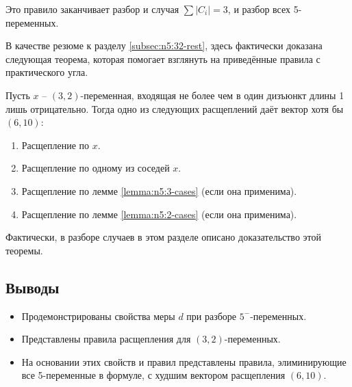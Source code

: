 Это правило заканчивает разбор и случая $\sum |C_i| = 3$, и разбор всех 5-переменных.

В качестве резюме к разделу \ref{subsec:n5:32-rest}, здесь фактически доказана следующая теорема, которая помогает взглянуть на приведённые правила с практического угла.

\begin{theorem}
 Пусть $x$ -- $(3,2)$-переменная, входящая не более чем в один дизъюнкт длины 1 лишь отрицательно. Тогда одно из следующих расщеплений даёт вектор хотя бы $(6,10)$:

 \begin{enumerate}
  \item Расщепление по $x$.
  \item Расщепление по одному из соседей $x$.
  \item Расщепление по лемме \ref{lemma:n5:3-cases} (если она применима).
  \item Расщепление по лемме \ref{lemma:n5:2-cases} (если она применима).
 \end{enumerate}

 \label{theorem:n5:32-rest}
\end{theorem}

Фактически, в разборе случаев в этом разделе описано доказательство этой теоремы.

\subsection{Выводы}
\label{subsec:n5:summary}

\begin{itemize}
 \item Продемонстрированы свойства меры $d$ при разборе $5^-$-переменных.
 \item Представлены правила расщепления для $(3,2)$-переменных.
 \item На основании этих свойств и правил представлены правила, элиминирующие все 5-переменные в формуле, с худшим вектором расщепления $(6,10)$.
\end{itemize}


